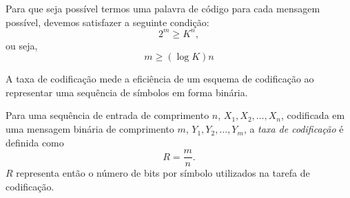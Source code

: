 
Para que seja possível termos uma palavra de código para cada mensagem possível,
devemos satisfazer a seguinte condição:
\begin{equation}
  2^m \geq K^n ,
\end{equation}
ou seja,
\begin{equation}
  m \geq (\log K) n
\end{equation}

A taxa de codificação mede a eficiência de um esquema de codificação 
ao representar uma sequência de símbolos em forma binária. 
\begin{definition}
  Para uma sequência de entrada de comprimento $n$, $X_1,X_2,\ldots,X_n$,
  codificada em uma mensagem binária de comprimento $m$, $Y_1,Y_2,\ldots,Y_m$,
  a \emph{taxa de codificação} é definida como
  \begin{equation}
    R = \frac{m}{n} .
  \end{equation}
  $R$ representa então o número de bits por símbolo utilizados na tarefa de codificação.
\end{definition}




